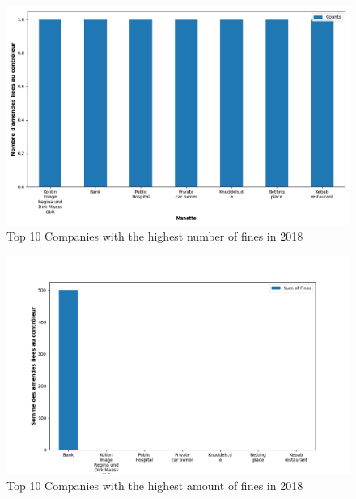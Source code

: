\documentclass[12pt]{article}
\begin{document}
\newpage

	
	\begin{multicols}{2}
	\begin{figure}
		[H]\centering\includegraphics[width=1.0\linewidth]{graphs/top10_controller_year}
		\caption{Top 10 Companies with the highest number of fines in 2018}
	\end{figure}
	\begin{figure}
		[H]\centering\includegraphics[width=1\linewidth]{graphs/top10_controller_year_fines}
		\caption{Top 10 Companies with the highest  amount of fines in 2018}
	 \end{figure}
	
	\end{multicols}
\end{document}
